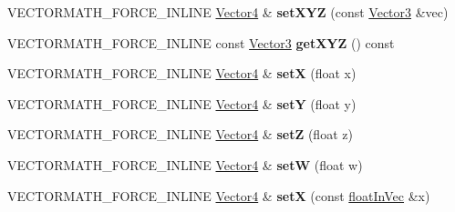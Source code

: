\begin{DoxyCompactItemize}
\item 
\mbox{\label{classVectormath_1_1Aos_1_1Vector4_a88cc1f151a0de0b632d9eda9f4048403}} 
V\+E\+C\+T\+O\+R\+M\+A\+T\+H\+\_\+\+F\+O\+R\+C\+E\+\_\+\+I\+N\+L\+I\+NE \hyperlink{classVectormath_1_1Aos_1_1Vector4}{Vector4} \& {\bfseries set\+X\+YZ} (const \hyperlink{classVectormath_1_1Aos_1_1Vector3}{Vector3} \&vec)
\item 
\mbox{\label{classVectormath_1_1Aos_1_1Vector4_ad3ecb37c046a5dc79f2638cb94ea734f}} 
V\+E\+C\+T\+O\+R\+M\+A\+T\+H\+\_\+\+F\+O\+R\+C\+E\+\_\+\+I\+N\+L\+I\+NE const \hyperlink{classVectormath_1_1Aos_1_1Vector3}{Vector3} {\bfseries get\+X\+YZ} () const
\item 
\mbox{\label{classVectormath_1_1Aos_1_1Vector4_a3b1066106df5011f068f45f9d81aa78e}} 
V\+E\+C\+T\+O\+R\+M\+A\+T\+H\+\_\+\+F\+O\+R\+C\+E\+\_\+\+I\+N\+L\+I\+NE \hyperlink{classVectormath_1_1Aos_1_1Vector4}{Vector4} \& {\bfseries setX} (float x)
\item 
\mbox{\label{classVectormath_1_1Aos_1_1Vector4_ad0e117a9abe04f1239a61b084c61a731}} 
V\+E\+C\+T\+O\+R\+M\+A\+T\+H\+\_\+\+F\+O\+R\+C\+E\+\_\+\+I\+N\+L\+I\+NE \hyperlink{classVectormath_1_1Aos_1_1Vector4}{Vector4} \& {\bfseries setY} (float y)
\item 
\mbox{\label{classVectormath_1_1Aos_1_1Vector4_ae0240167e06311cc56c68906a2c30f1f}} 
V\+E\+C\+T\+O\+R\+M\+A\+T\+H\+\_\+\+F\+O\+R\+C\+E\+\_\+\+I\+N\+L\+I\+NE \hyperlink{classVectormath_1_1Aos_1_1Vector4}{Vector4} \& {\bfseries setZ} (float z)
\item 
\mbox{\label{classVectormath_1_1Aos_1_1Vector4_af8ab35a1875d77ba0a514dc2c326c925}} 
V\+E\+C\+T\+O\+R\+M\+A\+T\+H\+\_\+\+F\+O\+R\+C\+E\+\_\+\+I\+N\+L\+I\+NE \hyperlink{classVectormath_1_1Aos_1_1Vector4}{Vector4} \& {\bfseries setW} (float w)
\item 
\mbox{\label{classVectormath_1_1Aos_1_1Vector4_af8ff7dda5664aee5d753afc2f1e36d15}} 
V\+E\+C\+T\+O\+R\+M\+A\+T\+H\+\_\+\+F\+O\+R\+C\+E\+\_\+\+I\+N\+L\+I\+NE \hyperlink{classVectormath_1_1Aos_1_1Vector4}{Vector4} \& {\bfseries setX} (const \hyperlink{classVectormath_1_1floatInVec}{float\+In\+Vec} \&x)

\end{DoxyCompactItemize}
